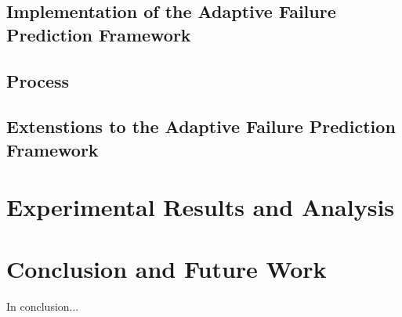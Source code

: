 \documentclass[12pt,letterpaper,oneside]{book}
\begin{document}
\section{Implementation of the Adaptive Failure Prediction Framework}


\section{Process}


\section{Extenstions to the Adaptive Failure Prediction Framework}


\chapter{Experimental Results and Analysis}

\chapter{Conclusion and Future Work}
	In conclusion...



\backmatter
	\singlespace
	
	 
	
	\clearpage
	
\end{document}
